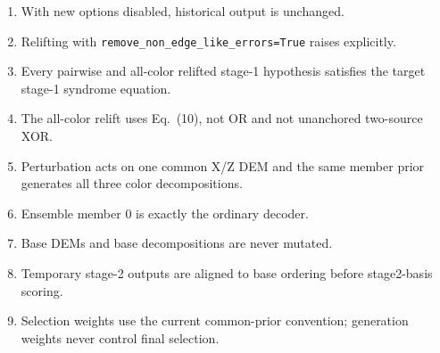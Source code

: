 \documentclass[11pt]{article}
\begin{document}
\begin{enumerate}
    \item With new options disabled, historical output is unchanged.
    \item Relifting with
    \texttt{remove\_non\_edge\_like\_errors=True} raises explicitly.
    \item Every pairwise and all-color relifted stage-1 hypothesis satisfies
    the target stage-1 syndrome equation.
    \item The all-color relift uses Eq.~(10), not OR and not unanchored
    two-source XOR.
    \item Perturbation acts on one common X/Z DEM and the same member prior
    generates all three color decompositions.
    \item Ensemble member $0$ is exactly the ordinary decoder.
    \item Base DEMs and base decompositions are never mutated.
    \item Temporary stage-2 outputs are aligned to base ordering before
    stage2-basis scoring.
    \item Selection weights use the current common-prior convention;
    generation weights never control final selection.
\end{enumerate}
\end{document}
